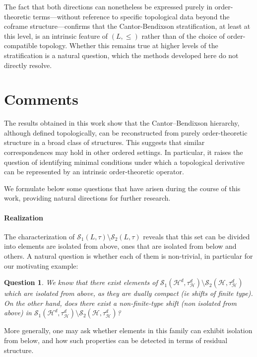 \documentclass{article}
\newcommand{\comm}[2]{\begin{tcolorbox}[colback=gray!40]\textbf{Comment} (#1) : #2\end{tcolorbox}}
\newtheorem{question}[theorem]{Question}
\begin{document}

The fact that both directions can nonetheless be expressed purely in order-theoretic terms---without reference to specific topological data beyond the coframe structure---confirms that the Cantor-Bendixson stratification, at least at this level, is an intrinsic feature of \((L,\leq)\) rather than of the choice of order-compatible topology. Whether this remains true at higher levels of the stratification is a natural question, which the methods developed here do not directly resolve.

\section{\label{section.comments}Comments}

The results obtained in this work show that the Cantor–Bendixson hierarchy, although defined topologically, can be reconstructed from purely order-theoretic structure in a broad class of structures. This suggests that similar correspondences may hold in other ordered settings. In particular, it raises the question of identifying minimal conditions under which a topological derivative can be represented by an intrinsic order-theoretic operator.

We formulate below some questions that have arisen during the course of this work, providing natural directions for further research.

\paragraph{Realization}
The characterization of $\mathcal{S}_1(L,\tau)\setminus \mathcal{S}_2(L,\tau)$ reveals that this set can be 
divided into elements are isolated from above, ones that are isolated from below and others. A natural question is whether each of them is non-trivial, in particular for our motivating example: 
\begin{question}
We know that there exist elements of $\mathcal{S}_1(\mathcal H^d,\tau_{\mathcal{H}}^d)\setminus \mathcal{S}_2(\mathcal H,\tau_{\mathcal{H}}^d)$ which are isolated from above, as they are dually compact (ie shifts of finite type). On the other hand, does there exist a non-finite-type shift (non isolated from above) in $\mathcal{S}_1(\mathcal H^d,\tau_{\mathcal{H}}^d)\setminus \mathcal{S}_2(\mathcal H,\tau_{\mathcal{H}}^d)$?
\end{question}
More generally, one may ask whether elements in this family can exhibit isolation from below, and how such properties can be detected in terms of residual structure.
\end{document}
